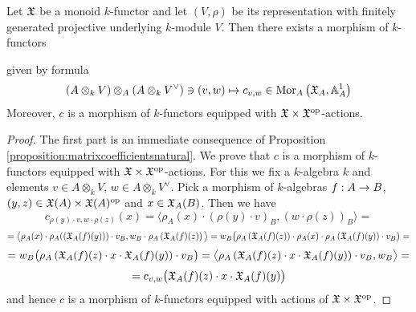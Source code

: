 \begin{corollary}\label{corollary:matrixcoefficientsnatural}
Let ${\mathfrak X}$ be a monoid $k$-functor and let $(V,\rho)$ be its representation with finitely generated projective underlying $k$-module $V$. Then there exists a morphism of $k$-functors
\begin{center}
\end{center}
given by formula
$$\left(A\otimes_kV\right)\otimes_A\left(A\otimes_kV^{\vee}\right)\ni (v,w)\mapsto c_{v,w}\in \mathrm{Mor}_A\left({\mathfrak X}_A,\mathbb{A}^1_A\right)$$
Moreover, $c$ is a morphism of $k$-functors equipped with ${\mathfrak X} \times {\mathfrak X}^{\mathrm{op}}$-actions.
\end{corollary}
\begin{proof}
The first part is an immediate consequence of Proposition \ref{proposition:matrixcoefficientsnatural}. We prove that $c$ is a morphism of $k$-functors equipped with ${\mathfrak X}\times {\mathfrak X}^{\mathrm{op}}$-actions. For this we fix a $k$-algebra $k$ and elements $v\in A\otimes_kV$, $w\in A\otimes_kV^{\vee}$. Pick a morphism of $k$-algebras $f:A\rightarrow B$, $(y,z)\in {\mathfrak X}(A)\times {\mathfrak X}(A)^{\mathrm{op}}$ and $x\in {\mathfrak X}_A(B)$. Then we have 
$$c_{\rho(y)\cdot v,w\cdot \rho(z)}(x) = \big\langle \rho_A(x)\cdot \left(\rho(y)\cdot v\right)_B, \left(w\cdot \rho(z)\right)_B \big\rangle =$$
$$= \big\langle \rho_A(x)\cdot \rho_A(\left({\mathfrak X}_A(f)(y)\right))\cdot v_B, w_B\cdot \rho_A\left({\mathfrak X}_A(f)(z)\right) \big\rangle = w_B\big(\rho_A\left({\mathfrak X}_A(f)(z)\right)\cdot \rho_A(x)\cdot \rho_A\left({\mathfrak X}_A(f)(y)\right)\cdot v_B \big)=$$
$$= w_B\big(\rho_A\left({\mathfrak X}_A(f)(z) \cdot x \cdot {\mathfrak X}_A(f)(y)\right)\cdot v_B \big) = \big\langle \rho_A\left({\mathfrak X}_A(f)(z) \cdot x \cdot {\mathfrak X}_A(f)(y)\right)\cdot v_B, w_B \big\rangle =  $$
$$= c_{v,w}\big({\mathfrak X}_A(f)(z) \cdot x \cdot {\mathfrak X}_A(f)(y)\big)$$
and hence $c$ is a morphism of $k$-functors equipped with actions of ${\mathfrak X}\times {\mathfrak X}^{\mathrm{op}}$.
\end{proof}





